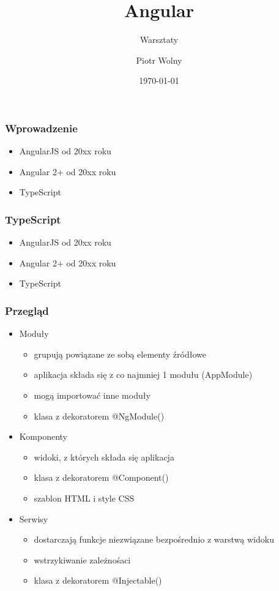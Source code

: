 \documentclass{beamer}
\title{Angular}
\subtitle{Warsztaty}
\author{Piotr Wolny}
\institute{e-point SA}
\date{\today}
\begin{document}
\begin{frame}
    \titlepage
\end{frame}

\begin{frame}
    \frametitle{Wprowadzenie}
    \begin{itemize}
        \item AngularJS od 20xx roku
        \item Angular 2+ od 20xx roku
        \item TypeScript
    \end{itemize}
\end{frame}

\begin{frame}
    \frametitle{TypeScript}
    \begin{itemize}
        \item AngularJS od 20xx roku
        \item Angular 2+ od 20xx roku
        \item TypeScript
    \end{itemize}
\end{frame}

\begin{frame}
    \frametitle{Przegląd}
    \begin{itemize}
        \item Moduły
            \begin{itemize}
                \item grupują powiązane ze sobą elementy źródłowe
                \item aplikacja składa się z co najmniej 1 modułu (AppModule)
                \item mogą importować inne moduły
                \item klasa z dekoratorem @NgModule()
            \end{itemize}
        \item Komponenty
            \begin{itemize}
                \item widoki, z których składa się aplikacja
                \item klasa z dekoratorem @Component()
                \item szablon HTML i style CSS
            \end{itemize}
        \item Serwisy
            \begin{itemize}
                \item dostarczają funkcje niezwiązane bezpośrednio z warstwą widoku
                \item wstrzykiwanie zależnośaci
                \item klasa z dekoratorem @Injectable()
            \end{itemize}
    \end{itemize}
\end{frame}
\end{document}
